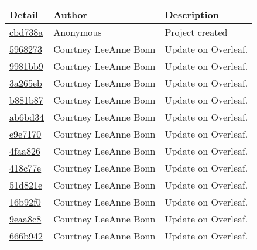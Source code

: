 \begin{tabular}{l l l}
\textbf{Detail} & \textbf{Author} & \textbf{Description}\\\hline
\href{https://github.com/courtbonn/CS-444/commit/cbd738a2355f41b47f0d5739d338addd0ff899d7}{cbd738a} & Anonymous & Project created\\\hline
\href{https://github.com/courtbonn/CS-444/commit/5968273bdc6f20c0eb2663c1745a8bee7cf91cbf}{5968273} & Courtney LeeAnne Bonn & Update on Overleaf.\\\hline
\href{https://github.com/courtbonn/CS-444/commit/9981bb915b8a7527475b770e2db4c4bb109f9af4}{9981bb9} & Courtney LeeAnne Bonn & Update on Overleaf.\\\hline
\href{https://github.com/courtbonn/CS-444/commit/3a265eb2f153abc0c3369c2756959ac0f289dda5}{3a265eb} & Courtney LeeAnne Bonn & Update on Overleaf.\\\hline
\href{https://github.com/courtbonn/CS-444/commit/b881b87efb0d55bbbec6b6e654de9e2ffedec317}{b881b87} & Courtney LeeAnne Bonn & Update on Overleaf.\\\hline
\href{https://github.com/courtbonn/CS-444/commit/ab6bd34b735418c82bf530d468d4ca8a579b5300}{ab6bd34} & Courtney LeeAnne Bonn & Update on Overleaf.\\\hline
\href{https://github.com/courtbonn/CS-444/commit/e9e7170448700563c8637ea905a8e1ea3467f11a}{e9e7170} & Courtney LeeAnne Bonn & Update on Overleaf.\\\hline
\href{https://github.com/courtbonn/CS-444/commit/4faa8268e3d1abeb8f3c1e4c2e2416ea90e6b1a8}{4faa826} & Courtney LeeAnne Bonn & Update on Overleaf.\\\hline
\href{https://github.com/courtbonn/CS-444/commit/418c77e69e2084e7694265a9bd074084f0ac1ba1}{418c77e} & Courtney LeeAnne Bonn & Update on Overleaf.\\\hline
\href{https://github.com/courtbonn/CS-444/commit/51d821ecc4c679b7e7f43d1c07506ebf55355e3c}{51d821e} & Courtney LeeAnne Bonn & Update on Overleaf.\\\hline
\href{https://github.com/courtbonn/CS-444/commit/16b92f0569ebc397a3cf0241e3c8d4e9618baf2c}{16b92f0} & Courtney LeeAnne Bonn & Update on Overleaf.\\\hline
\href{https://github.com/courtbonn/CS-444/commit/9eaa8c8057de569871bcf5df88fc642071a9cd5a}{9eaa8c8} & Courtney LeeAnne Bonn & Update on Overleaf.\\\hline
\href{https://github.com/courtbonn/CS-444/commit/666b9423e61dcf4748060c3da8b8a127e1348b31}{666b942} & Courtney LeeAnne Bonn & Update on Overleaf.\\\hline

\end{tabular}
